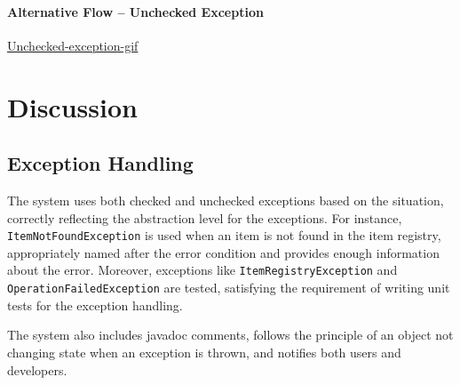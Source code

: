 \documentclass[a4paper]{scrreprt}
\begin{document}
\subsubsection*{Alternative Flow -- Unchecked Exception}
\href{https://github.com/VincentFerrigan/kth-iv1350-object-oriented-design#alternative-flow---unchecked-exception}{Unchecked-exception-gif}

%
\chapter{Discussion}
\label{sec:discussion}
\section*{Exception Handling}
The system uses both checked and unchecked exceptions based on the situation, correctly
reflecting the abstraction level for the exceptions.
For instance, \texttt{ItemNotFoundException} is used when an item is not found in the item registry,
appropriately named after the error condition and provides enough information about the error.
Moreover, exceptions like
\texttt{ItemRegistryException} and
\texttt{OperationFailedException} are tested,
satisfying the requirement of writing unit tests for the exception handling.

The system also includes javadoc comments, follows the principle of an object not changing state when an exception is thrown,
and notifies both users and developers.
\end{document}
